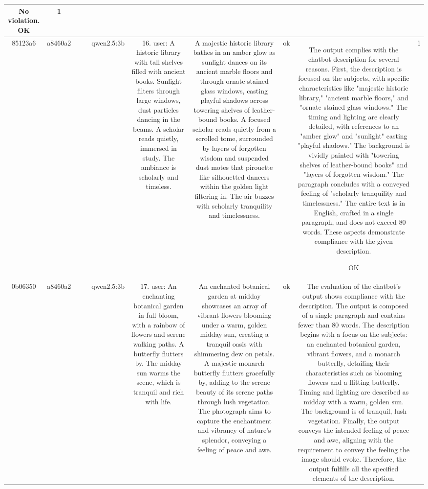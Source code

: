 \begin{table}[h!]
\begin{tabular}{|c|c|c|c|c|c|c|c|c|c|}
No violation.
OK & 1\\
\hline
85123a6 & a8460a2 &  &  & qwen2.5:3b & 16. user: A historic library with tall shelves filled with ancient books. Sunlight filters through large windows, dust particles dancing in the beams. A scholar reads quietly, immersed in study. The ambiance is scholarly and timeless. & A majestic historic library bathes in an amber glow as sunlight dances on its ancient marble floors and through ornate stained glass windows, casting playful shadows across towering shelves of leather-bound books. A focused scholar reads quietly from a scrolled tome, surrounded by layers of forgotten wisdom and suspended dust motes that pirouette like silhouetted dancers within the golden light filtering in. The air buzzes with scholarly tranquility and timelessness. & ok & The output complies with the chatbot description for several reasons. First, the description is focused on the subjects, with specific characteristics like "majestic historic library," "ancient marble floors," and "ornate stained glass windows." The timing and lighting are clearly detailed, with references to an "amber glow" and "sunlight" casting "playful shadows." The background is vividly painted with "towering shelves of leather-bound books" and "layers of forgotten wisdom." The paragraph concludes with a conveyed feeling of "scholarly tranquility and timelessness." The entire text is in English, crafted in a single paragraph, and does not exceed 80 words. These aspects demonstrate compliance with the given description.

OK & 1\\
\hline
0b06350 & a8460a2 &  &  & qwen2.5:3b & 17. user: An enchanting botanical garden in full bloom, with a rainbow of flowers and serene walking paths. A butterfly flutters by. The midday sun warms the scene, which is tranquil and rich with life. & An enchanted botanical garden at midday showcases an array of vibrant flowers blooming under a warm, golden midday sun, creating a tranquil oasis with shimmering dew on petals. A majestic monarch butterfly flutters gracefully by, adding to the serene beauty of its serene paths through lush vegetation. The photograph aims to capture the enchantment and vibrancy of nature's splendor, conveying a feeling of peace and awe. & ok & The evaluation of the chatbot's output shows compliance with the description. The output is composed of a single paragraph and contains fewer than 80 words. The description begins with a focus on the subjects: an enchanted botanical garden, vibrant flowers, and a monarch butterfly, detailing their characteristics such as blooming flowers and a flitting butterfly. Timing and lighting are described as midday with a warm, golden sun. The background is of tranquil, lush vegetation. Finally, the output conveys the intended feeling of peace and awe, aligning with the requirement to convey the feeling the image should evoke. Therefore, the output fulfills all the specified elements of the description.


\end{tabular}
\end{table}
